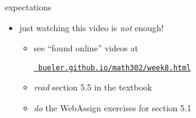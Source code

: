 \documentclass{beamer}
\begin{document}
\begin{frame}{expectations}

\begin{itemize}
\item just watching this video is \emph{not} enough!
     \begin{itemize}
     \item see ``found online'' videos at

     \centerline{\href{https://bueler.github.io/math302/week8.html}{\tt \color{cyan} bueler.github.io/math302/week8.html}}
     \item \emph{read} section 5.5 in the textbook
     \item \emph{do} the WebAssign exercises for section 5.1
     \end{itemize}
\end{itemize}
\end{frame}
\end{document}
